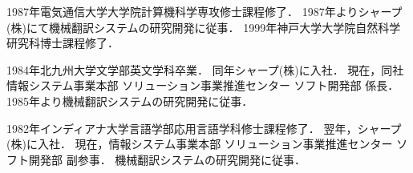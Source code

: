 \begin{biography}
{1987年電気通信大学大学院計算機科学専攻修士課程修了．
1987年よりシャープ(株)にて機械翻訳システムの研究開発に従事．
1999年神戸大学大学院自然科学研究科博士課程修了．}

{1984年北九州大学文学部英文学科卒業．
同年シャープ(株)に入社．
現在，同社情報システム事業本部
ソリューション事業推進センター ソフト開発部
係長．
1985年より機械翻訳システムの研究開発に従事．}

{1982年インディアナ大学言語学部応用言語学科修士課程修了．
翌年，シャープ(株)に入社．
現在，情報システム事業本部
ソリューション事業推進センター ソフト開発部
副参事．
機械翻訳システムの研究開発に従事．}

\end{biography}
\newpage
\

